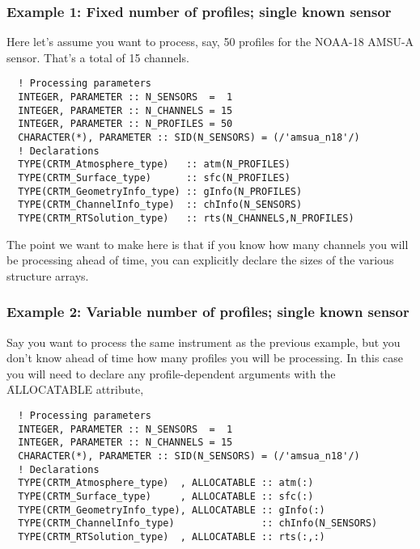 \subsubsection{Example 1: Fixed number of profiles; single known sensor}
\label{sec:declare_ex_fpsks}
Here let's assume you want to process, say, 50 profiles for the NOAA-18 AMSU-A sensor. That's a total of 15 channels. 
\begin{ttfamily}
  \begin{verbatim}
  ! Processing parameters
  INTEGER, PARAMETER :: N_SENSORS  =  1
  INTEGER, PARAMETER :: N_CHANNELS = 15
  INTEGER, PARAMETER :: N_PROFILES = 50
  CHARACTER(*), PARAMETER :: SID(N_SENSORS) = (/'amsua_n18'/)
  ! Declarations
  TYPE(CRTM_Atmosphere_type)   :: atm(N_PROFILES)
  TYPE(CRTM_Surface_type)      :: sfc(N_PROFILES)
  TYPE(CRTM_GeometryInfo_type) :: gInfo(N_PROFILES)  
  TYPE(CRTM_ChannelInfo_type)  :: chInfo(N_SENSORS)  
  TYPE(CRTM_RTSolution_type)   :: rts(N_CHANNELS,N_PROFILES)\end{verbatim}
\end{ttfamily}
The point we want to make here is that if you know how many channels you will be processing ahead of time, you can explicitly declare the sizes of the various structure arrays.

\subsubsection{Example 2: Variable number of profiles; single known sensor}
\label{sec:declare_ex_vpsks}
Say you want to process the same instrument as the previous example, but you don't know ahead of time how many profiles you will be processing. In this case you will need to declare any profile-dependent arguments with the \f{ALLOCATABLE} attribute,
\begin{ttfamily}
  \begin{verbatim}
  ! Processing parameters
  INTEGER, PARAMETER :: N_SENSORS  =  1
  INTEGER, PARAMETER :: N_CHANNELS = 15
  CHARACTER(*), PARAMETER :: SID(N_SENSORS) = (/'amsua_n18'/)
  ! Declarations
  TYPE(CRTM_Atmosphere_type)  , ALLOCATABLE :: atm(:)
  TYPE(CRTM_Surface_type)     , ALLOCATABLE :: sfc(:)
  TYPE(CRTM_GeometryInfo_type), ALLOCATABLE :: gInfo(:)  
  TYPE(CRTM_ChannelInfo_type)               :: chInfo(N_SENSORS)
  TYPE(CRTM_RTSolution_type)  , ALLOCATABLE :: rts(:,:)\end{verbatim}
\end{ttfamily}

